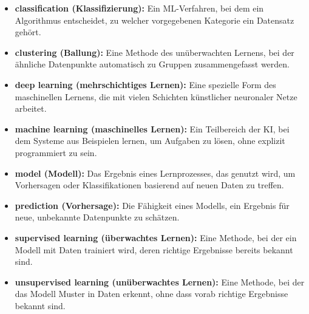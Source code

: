 \begin{itemize}
  \item \textbf{classification (Klassifizierung):} Ein ML-Verfahren, bei dem ein Algorithmus entscheidet, zu welcher vorgegebenen Kategorie ein Datensatz gehört.
  \item \textbf{clustering (Ballung):} Eine Methode des unüberwachten Lernens, bei der ähnliche Datenpunkte automatisch zu Gruppen zusammengefasst werden.
  \item \textbf{deep learning (mehrschichtiges Lernen):} Eine spezielle Form des maschinellen Lernens, die mit vielen Schichten künstlicher neuronaler Netze arbeitet.
  \item \textbf{machine learning (maschinelles Lernen):} Ein Teilbereich der KI, bei dem Systeme aus Beispielen lernen, um Aufgaben zu lösen, ohne explizit programmiert zu sein.
  \item \textbf{model (Modell):} Das Ergebnis eines Lernprozesses, das genutzt wird, um Vorhersagen oder Klassifikationen basierend auf neuen Daten zu treffen.
  \item \textbf{prediction (Vorhersage):} Die Fähigkeit eines Modells, ein Ergebnis für neue, unbekannte Datenpunkte zu schätzen.
  \item \textbf{supervised learning (überwachtes Lernen):} Eine Methode, bei der ein Modell mit Daten trainiert wird, deren richtige Ergebnisse bereits bekannt sind.
  \item \textbf{unsupervised learning (unüberwachtes Lernen):} Eine Methode, bei der das Modell Muster in Daten erkennt, ohne dass vorab richtige Ergebnisse bekannt sind.
\end{itemize}